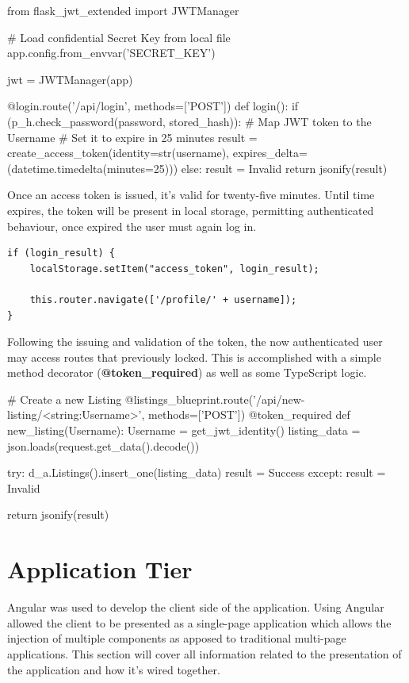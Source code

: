 \begin{python}[caption=Issuing a limited JWT Token ]
from flask_jwt_extended import JWTManager

# Load confidential Secret Key from local file
app.config.from_envvar('SECRET_KEY')

jwt = JWTManager(app)

@login.route('/api/login', methods=['POST'])
def login():
    if (p_h.check_password(password, stored_hash)): 
        # Map JWT token to the Username
        # Set it to expire in 25 minutes
        result = create_access_token(identity=str(username), expires_delta=(datetime.timedelta(minutes=25)))
    else:
        result = Invalid
    return jsonify(result)
\end{python}
      
\newpage
Once an access token is issued, it's valid for twenty-five minutes. Until time expires, the token will be present in local storage, permitting authenticated behaviour, once expired the user must again log in.

\begin{lstlisting}[caption=Storing the Authentication Token]
if (login_result) {
    localStorage.setItem("access_token", login_result);
    
    this.router.navigate(['/profile/' + username]);
}
\end{lstlisting}

Following the issuing and validation of the token, the now authenticated user may access routes that previously locked. This is accomplished with a simple method decorator (\textbf{@token\_required}) as well as some TypeScript logic. \newline

\begin{python}[caption=Issuing a limited JWT Token]
# Create a new Listing
@listings_blueprint.route('/api/new-listing/<string:Username>', methods=['POST'])
@token_required
def new_listing(Username):
    Username = get_jwt_identity()
    listing_data = json.loads(request.get_data().decode())
   
    try: 
        d_a.Listings().insert_one(listing_data) 
        result = Success
    except:
        result = Invalid
    
    return jsonify(result)
\end{python}

\section{Application Tier}
Angular was used to develop the client side of the application. Using Angular allowed the client to be presented as a single-page application which allows the injection of multiple components as apposed to traditional multi-page applications. This section will cover all information related to the presentation of the application and how it's wired together.

